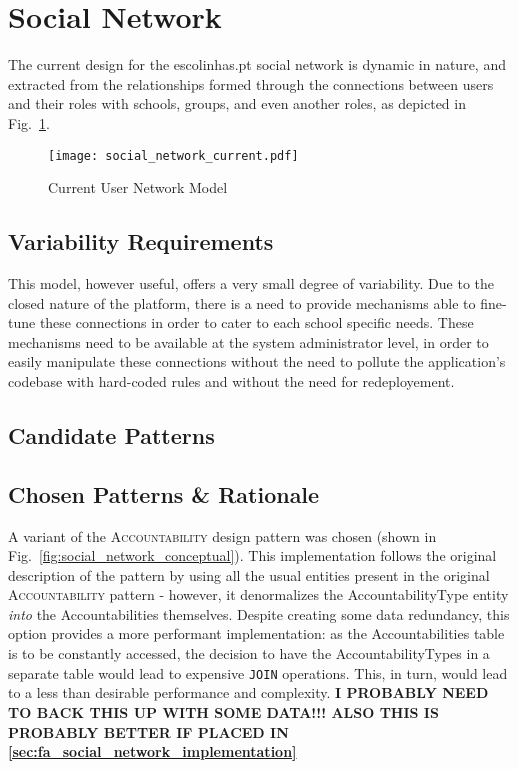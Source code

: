 \section{Social Network}\label{sec:fa_social_network}

The current design for the escolinhas.pt social network is dynamic in nature, and extracted from the relationships formed through the connections between users and their roles with schools, groups, and even another roles, as depicted in Fig.~\ref{fig:social_network_current}.

\begin{figure}[H]
  \centering
  \texttt{[image: social\_network\_current.pdf]}
  \caption{Current User Network Model}
  \label{fig:social_network_current}
\end{figure}

\subsection{Variability Requirements}\label{sec:fa_social_network_variability_requirements}

This model, however useful, offers a very small degree of variability. Due to the closed nature of the platform, there is a need to provide mechanisms able to fine-tune these connections in order to cater to each school specific needs. These mechanisms need to be available at the system administrator level, in order to easily manipulate these connections without the need to pollute the application's codebase with hard-coded rules and without the need for redeployement.

\subsection{Candidate Patterns}\label{sec:fa_social_network_candidate_patterns}

\subsection{Chosen Patterns \& Rationale}\label{sec:fa_social_network_chosen_patterns_rationale}

A variant of the \textsc{Accountability} design pattern was chosen (shown in Fig.~\ref{fig:social_network_conceptual}). This implementation follows the original description of the pattern by using all the usual entities present in the original \textsc{Accountability} pattern \cite{fowler_accountability} - however, it denormalizes the AccountabilityType entity \emph{into} the Accountabilities themselves. Despite creating some data redundancy, this option provides a more performant implementation: as the Accountabilities table is to be constantly accessed, the decision to have the AccountabilityTypes in a separate table would lead to expensive \verb!JOIN! operations. This, in turn, would lead to a less than desirable performance and complexity. \textbf{I PROBABLY NEED TO BACK THIS UP WITH SOME DATA!!! ALSO THIS IS PROBABLY BETTER IF PLACED IN \ref{sec:fa_social_network_implementation}}

